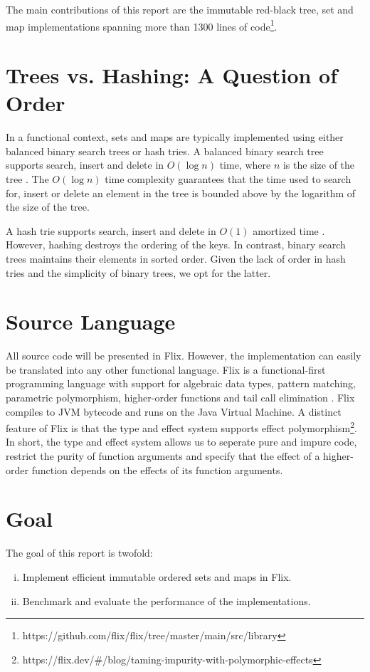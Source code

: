 \documentclass[../main.tex]{subfiles}
\begin{document}
The main contributions of this report are the immutable red-black tree, set and map implementations spanning more than 1300 lines of code\footnote{https://github.com/flix/flix/tree/master/main/src/library}.

\section{Trees vs. Hashing: A Question of Order}

In a functional context, sets and maps are typically implemented using either balanced binary search trees or hash tries. A balanced binary search tree supports search, insert and delete in $O(\log{n})$ time, where $n$ is the size of the tree \citep{cormen-et-al-2009}. The $O(\log{n})$ time complexity guarantees that the time used to search for, insert or delete an element in the tree is bounded above by the logarithm of the size of the tree.

A hash trie supports search, insert and delete in $O(1)$ amortized time \citep{bagwell-2001}. However, hashing destroys the ordering of the keys. In contrast, binary search trees maintains their elements in sorted order. Given the lack of order in hash tries and the simplicity of binary trees, we opt for the latter.

\section{Source Language}

All source code will be presented in Flix. However, the implementation can easily be translated into any other functional language. Flix is a functional-first programming language with support for algebraic data types, pattern matching, parametric polymorphism, higher-order functions and tail call elimination \citep{magnus-et-al-2016, magnus-et-al-2018}. Flix compiles to JVM bytecode and runs on the Java Virtual Machine. A distinct feature of Flix is that the type and effect system supports effect polymorphism\footnote{https://flix.dev/#/blog/taming-impurity-with-polymorphic-effects}. In short, the type and effect system allows us to seperate pure and impure code, restrict the purity of function arguments and specify that the effect of a higher-order function depends on the effects of its function arguments.

\section{Goal}

The goal of this report is twofold:

\begin{enumerate}[(i)]
\item Implement efficient immutable ordered sets and maps in Flix.
\item Benchmark and evaluate the performance of the implementations.
\end{enumerate}
\end{document}
